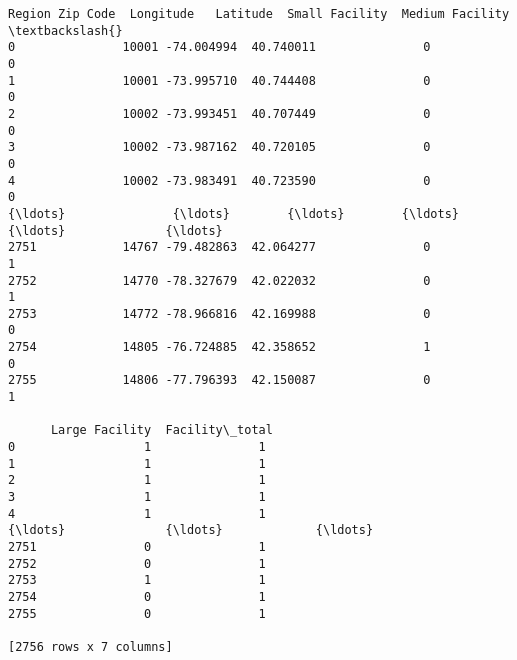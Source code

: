 \documentclass[11pt]{article}
\makeatletter
\newcommand{\boxspacing}{\kern\kvtcb@left@rule\kern\kvtcb@boxsep}
\newcommand{\prompt}[4]{
        {\ttfamily\llap{{\color{#2}[#3]:\hspace{3pt}#4}}\vspace{-\baselineskip}}
    }
\makeatother
\begin{document}
            \begin{tcolorbox}[breakable, size=fbox, boxrule=.5pt, pad at break*=1mm, opacityfill=0]
\prompt{Out}{outcolor}{30}{\boxspacing}
\begin{Verbatim}[commandchars=\\\{\}]
      Region Zip Code  Longitude   Latitude  Small Facility  Medium Facility  \textbackslash{}
0               10001 -74.004994  40.740011               0                0
1               10001 -73.995710  40.744408               0                0
2               10002 -73.993451  40.707449               0                0
3               10002 -73.987162  40.720105               0                0
4               10002 -73.983491  40.723590               0                0
{\ldots}               {\ldots}        {\ldots}        {\ldots}             {\ldots}              {\ldots}
2751            14767 -79.482863  42.064277               0                1
2752            14770 -78.327679  42.022032               0                1
2753            14772 -78.966816  42.169988               0                0
2754            14805 -76.724885  42.358652               1                0
2755            14806 -77.796393  42.150087               0                1

      Large Facility  Facility\_total
0                  1               1
1                  1               1
2                  1               1
3                  1               1
4                  1               1
{\ldots}              {\ldots}             {\ldots}
2751               0               1
2752               0               1
2753               1               1
2754               0               1
2755               0               1

[2756 rows x 7 columns]
\end{Verbatim}
\end{tcolorbox}
        
\end{document}
